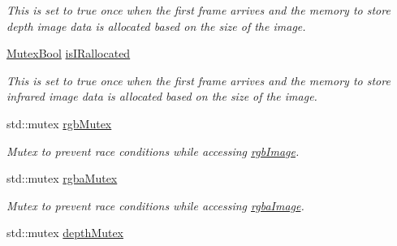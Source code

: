 \begin{DoxyCompactItemize}
\begin{DoxyCompactList}\small\item\em This is set to true once when the first frame arrives and the memory to store depth image data is allocated based on the size of the image. \end{DoxyCompactList}\item 
\hypertarget{classpersonal_robotics_1_1_kinect_reader_ab9238f5c5b09575d866b10ad0ef8ea9f}{}\hyperlink{classpersonal_robotics_1_1_mutex_type}{Mutex\+Bool} \hyperlink{classpersonal_robotics_1_1_kinect_reader_ab9238f5c5b09575d866b10ad0ef8ea9f}{is\+I\+Rallocated}\label{classpersonal_robotics_1_1_kinect_reader_ab9238f5c5b09575d866b10ad0ef8ea9f}

\begin{DoxyCompactList}\small\item\em This is set to true once when the first frame arrives and the memory to store infrared image data is allocated based on the size of the image. \end{DoxyCompactList}\item 
\hypertarget{classpersonal_robotics_1_1_kinect_reader_af8a4fd4f23c05743cf4f5ff5a9e5eb78}{}std\+::mutex \hyperlink{classpersonal_robotics_1_1_kinect_reader_af8a4fd4f23c05743cf4f5ff5a9e5eb78}{rgb\+Mutex}\label{classpersonal_robotics_1_1_kinect_reader_af8a4fd4f23c05743cf4f5ff5a9e5eb78}

\begin{DoxyCompactList}\small\item\em Mutex to prevent race conditions while accessing \hyperlink{classpersonal_robotics_1_1_kinect_reader_a32b1651f2e04d3d53a0f1bd6b0b490a1}{rgb\+Image}. \end{DoxyCompactList}\item 
\hypertarget{classpersonal_robotics_1_1_kinect_reader_a815a1807b9d1f78962840e490715cfbf}{}std\+::mutex \hyperlink{classpersonal_robotics_1_1_kinect_reader_a815a1807b9d1f78962840e490715cfbf}{rgba\+Mutex}\label{classpersonal_robotics_1_1_kinect_reader_a815a1807b9d1f78962840e490715cfbf}

\begin{DoxyCompactList}\small\item\em Mutex to prevent race conditions while accessing \hyperlink{classpersonal_robotics_1_1_kinect_reader_a57e3ccdf857990fca134a3c01898ceb7}{rgba\+Image}. \end{DoxyCompactList}\item 
\hypertarget{classpersonal_robotics_1_1_kinect_reader_a706d092b43c447084628ae31444006f5}{}std\+::mutex \hyperlink{classpersonal_robotics_1_1_kinect_reader_a706d092b43c447084628ae31444006f5}{depth\+Mutex}\label{classpersonal_robotics_1_1_kinect_reader_a706d092b43c447084628ae31444006f5}


\end{DoxyCompactItemize}
